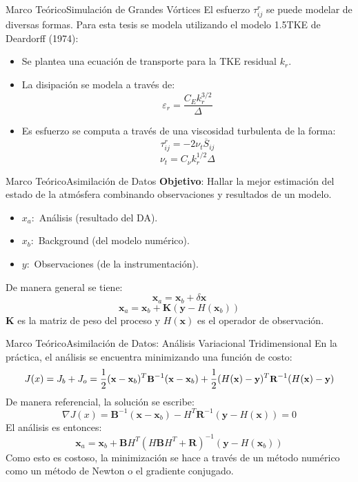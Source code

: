\documentclass[mathserif,10pt]{beamer}
\newcommand{\be}{\begin{equation}}
\newcommand{\ee}{\end{equation}}
\begin{document}
\begin{frame}{Marco Teórico}{Simulación de Grandes Vórtices}
	El esfuerzo $\tau_{ij}^r$ se puede modelar de diversas formas. Para esta tesis se modela utilizando el modelo 1.5TKE de Deardorff (1974):
	\begin{itemize}
		\item Se plantea una ecuación de transporte para la TKE residual $k_r$.
		\item La disipación se modela a través de:
		\be \varepsilon_r = \frac{C_E k_r^{3/2}}{\Delta} \ee
		\item Es esfuerzo se computa a través de una viscosidad turbulenta de la forma:
		\be \tau_{ij}^r = -2\nu_t \overline{S}_{ij} \ee
		\be \nu_t = C_\nu k_r^{1/2}\Delta \ee
	\end{itemize}
\end{frame}

\begin{frame}{Marco Teórico}{Asimilación de Datos}
	\textbf{Objetivo}: Hallar la mejor estimación del estado de la atmósfera combinando observaciones y resultados de un modelo.
	\begin{itemize}
		\item $x_a:$ Análisis (resultado del DA).
		\item $x_b:$ Background (del modelo numérico).
		\item $y:$ Observaciones (de la instrumentación).
	\end{itemize}
	De manera general se tiene:
	\begin{equation}
	\textbf{x}_a = \textbf{x}_b + \delta \textbf{x}
	\end{equation}
	\begin{equation}\label{eq:03_dataassim1}
	\textbf{x}_a = \textbf{x}_b + \textbf{K}(\textbf{y} - H(\textbf{x}_b))
	\end{equation}
	$\textbf{K}$ es la matriz de peso del proceso y $H(\textbf{x})$ es el operador de observación.
\end{frame}

\begin{frame}{Marco Teórico}{Asimilación de Datos: Análisis Variacional Tridimensional}
	En la práctica, el análisis se encuentra minimizando una función de costo:
	\be \small
	J(x) = J_b + J_o = \frac{1}{2}(\textbf{x}-\textbf{x}_b)^T \textbf{B}^{-1}(\textbf{x}-\textbf{x}_b) + \frac{1}{2}(H(\textbf{x})-\textbf{y})^T \textbf{R}^{-1}(H(\textbf{x})-\textbf{y})
	\ee
	De manera referencial, la solución se escribe:
	\be 
	\nabla J(x) = \textbf{B}^{-1}(\textbf{x}-\textbf{x}_b)-H^T\textbf{R}^{-1}(\textbf{y}-H(\textbf{x}))=0
	\ee
	El análisis es entonces:
	\be \label{eq:03_dataassim}
	\textbf{x}_a = \textbf{x}_b + \textbf{B}H^T(H\textbf{B}H^T+\textbf{R})^{-1}(\textbf{y}-H(\textbf{x}_b))
	\ee
	Como esto es costoso, la minimización se hace a través de un método numérico como un método de Newton o el gradiente conjugado.
\end{frame}
\end{document}
